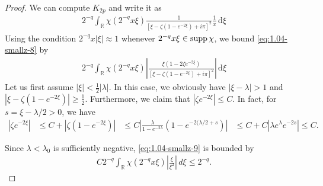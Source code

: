 \documentclass[../dissertation.tex]{subfiles}
\begin{document}
\begin{proof}
	We can compute $K_{2p}$ and write it as
	\begin{align}\label{eq:1.04-smallz-8}
		2^{-q} 
		\int_{\mathbb R} 
			\chi\left( 2^{-q} x \xi \right)
			\frac{1}{\left[\xi - \zeta\left(1-e^{-2\xi}\right) + i \pi \right]^2}
			\frac{1}{x}
		\, \mathrm{d}\xi
	\end{align}
	Using the condition $2^{-q} x |\xi| \approx 1$ whenever $2^{-q} x \xi \in \operatorname{supp} \chi$, 
	we bound \eqref{eq:1.04-smallz-8} by 
	\begin{align}\label{eq:1.04-smallz-9}
		2^{-q} 
		\int_{\mathbb R} \chi\left( 2^{-q} x \xi \right) 
			\left|
				\frac{\xi(1 - 2 \zeta e^{-2\xi})} {\left[\xi - \zeta\left(1-e^{-2\xi}\right) + i \pi \right]^2}
			\right|
		\, \mathrm{d}\xi
	\end{align}
	Let us first assume $\displaystyle |\xi| < \frac{1}{2}|\lambda|$. In this case, we obviously have 
	$|\xi - \lambda| > 1$ and 
	$\displaystyle \left| \xi - \zeta\left(1-e^{-2\xi}\right) \right| \geq \frac{1}{2}$. 
	Furthermore, we claim that $\left|\zeta e^{-2\xi}\right| \leq C$. In fact, for 
	$s = \xi - \lambda/2 > 0$, we have
	\begin{align*}
		\left| \zeta e^{-2\xi} \right|
			&\leq C + \left| \zeta\left(1 - e^{-2\xi}\right) \right|
			&\leq C 
				\left| 
					\frac{\lambda}
						{1-e^{-2\lambda}}\left(1 - e^{-2(\lambda/2+s}\right) 
				\right|
			&\leq C + C\left|\lambda e^{\lambda} e^{-2s}\right|
			\leq C.
	\end{align*}

	Since $\lambda < \lambda_0$ is sufficiently negative, \eqref{eq:1.04-smallz-9}
	is bounded by 
	\begin{align}\label{eq:1.04-smallz-10}
		C 2^{-q} 
		\int_{\mathbb R} 
			\chi\left(2^{-q} x \xi\right) \left|\frac{\xi}{\xi^2}\right| 
		\,d\xi
		\leq 2^{-q}.
	\end{align}


\end{proof}
\end{document}

